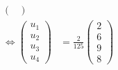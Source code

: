 \documentclass{exercise}
\begin{document}
\begin{itemize}
\begin{align*}
\begin{pmatrix}
            \end{pmatrix}\\
            \iff \begin{pmatrix}
                u_1\\u_2\\u_3\\u_4
            \end{pmatrix} &= \frac{2}{125}\begin{pmatrix}
                2\\6\\9\\8
            \end{pmatrix}
        \end{align*}
    \end{itemize}
\end{document}
